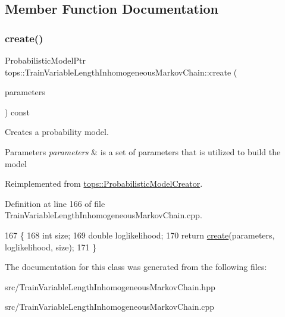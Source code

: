 \subsection{Member Function Documentation}
\mbox{\label{classtops_1_1TrainVariableLengthInhomogeneousMarkovChain_a1a0e7cada3c58961aa186904214a6dac}} 
\subsubsection{\texorpdfstring{create()}{create()}}
{\footnotesize\ttfamily Probabilistic\+Model\+Ptr tops\+::\+Train\+Variable\+Length\+Inhomogeneous\+Markov\+Chain\+::create (\begin{DoxyParamCaption}\item[{\hyperlink{classtops_1_1ProbabilisticModelParameters}{Probabilistic\+Model\+Parameters} \&}]{parameters }\end{DoxyParamCaption}) const\hspace{0.3cm}{\ttfamily [virtual]}}



Creates a probability model. 


\begin{DoxyParams}{Parameters}
{\em parameters} & is a set of parameters that is utilized to build the model \\
\hline
\end{DoxyParams}


Reimplemented from \hyperlink{classtops_1_1ProbabilisticModelCreator_afed6c8ffa45fff446bdaa8b533da8f7c}{tops\+::\+Probabilistic\+Model\+Creator}.



Definition at line 166 of file Train\+Variable\+Length\+Inhomogeneous\+Markov\+Chain.\+cpp.


\begin{DoxyCode}
167                                                                  \{
168         \textcolor{keywordtype}{int} size;
169         \textcolor{keywordtype}{double} loglikelihood;
170         \textcolor{keywordflow}{return} \hyperlink{classtops_1_1TrainVariableLengthInhomogeneousMarkovChain_a1a0e7cada3c58961aa186904214a6dac}{create}(parameters, loglikelihood, size);
171 \}
\end{DoxyCode}


The documentation for this class was generated from the following files\+:\begin{DoxyCompactItemize}
\item 
src/Train\+Variable\+Length\+Inhomogeneous\+Markov\+Chain.\+hpp\item 
src/Train\+Variable\+Length\+Inhomogeneous\+Markov\+Chain.\+cpp\end{DoxyCompactItemize}
